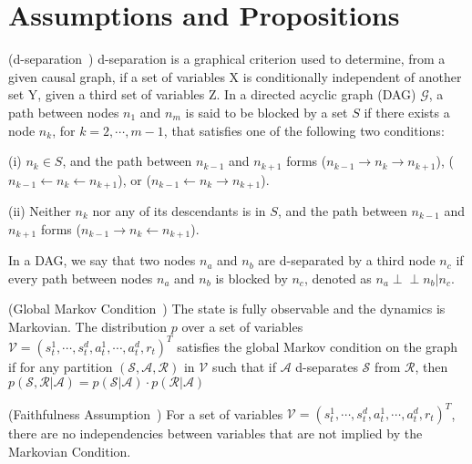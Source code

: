 \section{Assumptions and Propositions}
\label{sec:app_ass}
\begin{assumption}
(d-separation~\citep{pearl2009causality}) d-separation is a graphical criterion used to determine, from a given causal graph, if a set of variables X is conditionally independent of another set Y, given a third set of variables Z. 
In a directed acyclic graph (DAG) $\mathcal{G}$, a path between nodes $n_1$ and $n_m$ is said to be blocked by a set $S$ if there exists a node $n_k$, for $k = 2, \cdots, m-1$, that satisfies one of the following two conditions:

(i) $n_k \in S$, and the path between $n_{k-1}$ and $n_{k+1}$ forms ($n_{k-1} \rightarrow n_k \rightarrow n_{k+1}$), ($n_{k-1} \leftarrow n_k \leftarrow n_{k+1}$), or ($n_{k-1} \leftarrow n_k \rightarrow n_{k+1}$). 

(ii) Neither $n_k$ nor any of its descendants is in $S$, and the path between $n_{k-1}$ and $n_{k+1}$ forms ($n_{k-1} \rightarrow n_k \leftarrow n_{k+1}$). 

In a DAG, we say that two nodes $n_a$ and $n_b$ are d-separated by a third node $n_c$ if every path between nodes $n_a$ and $n_b$ is blocked by $n_c$, denoted as $n_a  \! \perp \!\!\! \perp n_b|n_c$. 
\end{assumption}

\begin{assumption}
    (Global Markov Condition~\citep{spirtes2001causation, pearl2009causality}) The state is fully observable and the dynamics is Markovian. The distribution $p$ over a set of variables $\mathcal{V}=(s^1_{t},\cdots,s^d_{t},a^1_{t},\cdots,a^d_{t},r_t)^T$ satisfies the global Markov condition on the graph if for any partition $(\mathcal{S, A, R})$ in $\mathcal{V}$ such that if $\mathcal{A}$ d-separates $\mathcal{S}$ from $\mathcal{R}$, then $p(\mathcal{S},\mathcal{R}|\mathcal{A}) = p(\mathcal{S}|\mathcal{A})\cdot p(\mathcal{R}|\mathcal{A})$
\end{assumption}

\begin{assumption}
    (Faithfulness Assumption~\citep{spirtes2001causation, pearl2009causality}) 
For a set of variables $\mathcal{V}=(s^1_{t},\cdots,s^d_{t},a^1_{t},\cdots,a^d_{t},r_t)^T$, there are no independencies between variables that are not implied by the Markovian Condition.
\end{assumption}

